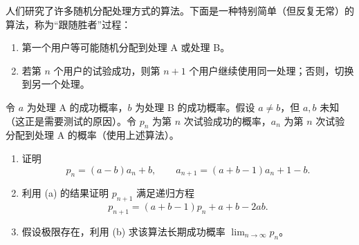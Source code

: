 \documentclass[UTF8,12pt,a4paper,fontset=fandol]{ctexart}
\begin{document}
\begin{enumerate}
  人们研究了许多随机分配处理方式的算法。下面是一种特别简单（但反复无常）的算法，称为“跟随胜者”过程：
  \begin{enumerate}
    \item[(i)] 第一个用户等可能随机分配到处理 A 或处理 B。
    \item[(ii)] 若第 $n$ 个用户的试验成功，则第 $n+1$ 个用户继续使用同一处理；否则，切换到另一个处理。
  \end{enumerate}
  令 $a$ 为处理 A 的成功概率，$b$ 为处理 B 的成功概率。假设 $a\ne b$，但 $a,b$ 未知（这正是需要测试的原因）。令 $p_n$ 为第 $n$ 次试验成功的概率，$a_n$ 为第 $n$ 次试验分配到处理 A 的概率（使用上述算法）。
  \begin{enumerate}
    \item 证明
    \[
      p_n=(a-b)a_n+b,\qquad
      a_{n+1}=(a+b-1)a_n+1-b.
    \]
    \item 利用 (a) 的结果证明 $p_{n+1}$ 满足递归方程
    \[
      p_{n+1}=(a+b-1)p_n+a+b-2ab.
    \]
    \item 假设极限存在，利用 (b) 求该算法长期成功概率 $\lim_{n\to\infty}p_n$。
  \end{enumerate}
\end{enumerate}
\end{document}
